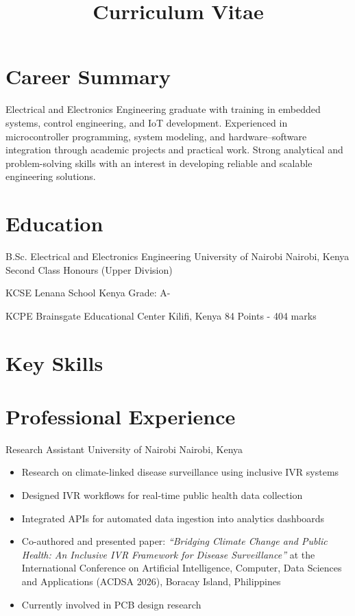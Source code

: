 \documentclass[11pt,a4paper]{moderncv}
\title{Curriculum Vitae}
\begin{document}
\makecvtitle

\section{Career Summary}
Electrical and Electronics Engineering graduate with training in embedded systems,
control engineering, and IoT development. Experienced in microcontroller programming,
system modeling, and hardware–software integration through academic projects and
practical work. Strong analytical and problem-solving skills with an interest in
developing reliable and scalable engineering solutions.

\section{Education}

{B.Sc. Electrical and Electronics Engineering}
{University of Nairobi}
{Nairobi, Kenya}
{}
{Second Class Honours (Upper Division)}

{KCSE}
{Lenana School}
{Kenya}
{}
{Grade: A-}

{KCPE}
{Brainsgate Educational Center}
{Kilifi, Kenya}
{}
{84 Points - 404 marks}

\section{Key Skills}


\section{Professional Experience}

{Research Assistant}
{University of Nairobi}
{Nairobi, Kenya}
{}
{\begin{itemize}
\item Research on climate-linked disease surveillance using inclusive IVR systems
\item Designed IVR workflows for real-time public health data collection
\item Integrated APIs for automated data ingestion into analytics dashboards
\item Co-authored and presented paper: \textit{“Bridging Climate Change and Public Health: An Inclusive IVR Framework for Disease Surveillance”} at the International Conference on Artificial Intelligence, Computer, Data Sciences and Applications (ACDSA 2026), Boracay Island, Philippines
\item Currently involved in PCB design research
\end{itemize}}
\end{document}
